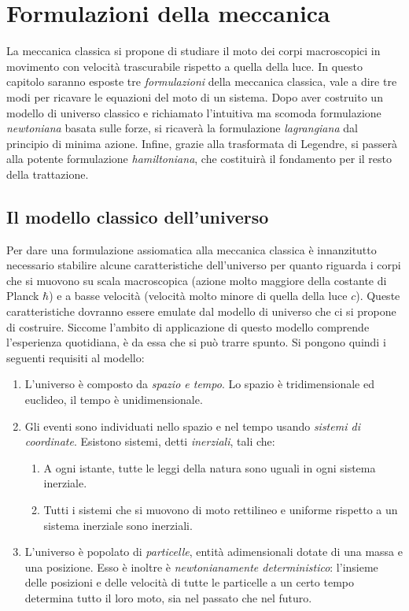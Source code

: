 \chapter{Formulazioni della meccanica}
La meccanica classica si propone di studiare il moto dei corpi macroscopici in movimento con velocità trascurabile rispetto a quella della luce. In questo capitolo saranno esposte tre \emph{formulazioni} della meccanica classica, vale a dire tre modi per ricavare le equazioni del moto di un sistema. Dopo aver costruito un modello di universo classico e richiamato l'intuitiva ma scomoda formulazione \emph{newtoniana} basata sulle forze, si ricaverà la formulazione \emph{lagrangiana} dal principio di minima azione. Infine, grazie alla trasformata di Legendre, si passerà alla potente formulazione \emph{hamiltoniana}, che costituirà il fondamento per il resto della trattazione.

\section{Il modello classico dell'universo}
Per dare una formulazione assiomatica alla meccanica classica è innanzitutto necessario stabilire alcune caratteristiche dell'universo per quanto riguarda i corpi che si muovono su scala macroscopica (azione molto maggiore della costante di Planck $\hbar$) e a basse velocità (velocità molto minore di quella della luce $c$). Queste caratteristiche dovranno essere emulate dal modello di universo che ci si propone di costruire. Siccome l'ambito di applicazione di questo modello comprende l'esperienza quotidiana, è da essa che si può trarre spunto. Si pongono quindi i seguenti requisiti al modello:
\begin{enumerate}
  \item L'universo è composto da \emph{spazio e tempo}. Lo spazio è tridimensionale ed euclideo, il tempo è unidimensionale.
  \item  Gli eventi sono individuati nello spazio e nel tempo usando \emph{sistemi di coordinate}. Esistono sistemi, detti \emph{inerziali}, tali che:
  \begin{enumerate}
    \item A ogni istante, tutte le leggi della natura sono uguali in ogni sistema inerziale.
    \item Tutti i sistemi che si muovono di moto rettilineo e uniforme rispetto a un sistema inerziale sono inerziali.
  \end{enumerate}
  \item L'universo è popolato di \emph{particelle}, entità adimensionali dotate di una massa e una posizione. Esso è inoltre è \emph{newtonianamente deterministico}: l'insieme delle posizioni e delle velocità di tutte le particelle a un certo tempo determina tutto il loro moto, sia nel passato che nel futuro.
\end{enumerate}

